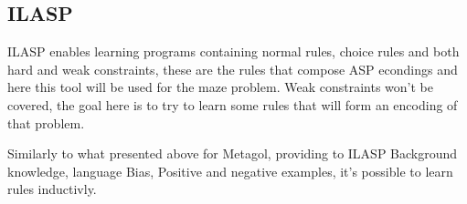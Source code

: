 \subsection{ILASP}

ILASP enables learning programs containing normal rules, choice rules and both hard and weak constraints, these are the rules that compose ASP econdings and here this tool will be used for the maze problem. Weak constraints won't be covered, the goal here is to try to learn some rules that will form an encoding of that problem.

Similarly to what presented above for Metagol, providing to ILASP Background knowledge, language Bias, Positive and negative examples, it's possible to learn rules inductivly.


